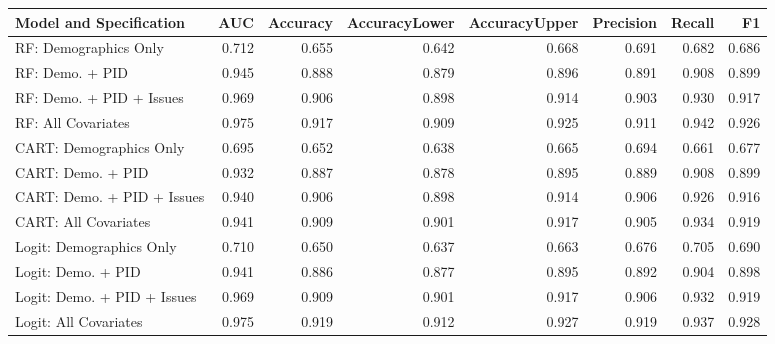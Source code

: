 \begin{table}[H]
\centering
\begin{tabular}{lrrrrrrr}
  \toprule
Model and Specification & AUC & Accuracy & AccuracyLower & AccuracyUpper & Precision & Recall & F1 \\ 
  \midrule
RF: Demographics Only & 0.712 & 0.655 & 0.642 & 0.668 & 0.691 & 0.682 & 0.686 \\ 
  RF: Demo. + PID & 0.945 & 0.888 & 0.879 & 0.896 & 0.891 & 0.908 & 0.899 \\ 
  RF: Demo. + PID + Issues & 0.969 & 0.906 & 0.898 & 0.914 & 0.903 & 0.930 & 0.917 \\ 
  RF: All Covariates & 0.975 & 0.917 & 0.909 & 0.925 & 0.911 & 0.942 & 0.926 \\ 
  CART: Demographics Only & 0.695 & 0.652 & 0.638 & 0.665 & 0.694 & 0.661 & 0.677 \\ 
  CART: Demo. + PID & 0.932 & 0.887 & 0.878 & 0.895 & 0.889 & 0.908 & 0.899 \\ 
  CART: Demo. + PID + Issues & 0.940 & 0.906 & 0.898 & 0.914 & 0.906 & 0.926 & 0.916 \\ 
  CART: All Covariates & 0.941 & 0.909 & 0.901 & 0.917 & 0.905 & 0.934 & 0.919 \\ 
  Logit: Demographics Only & 0.710 & 0.650 & 0.637 & 0.663 & 0.676 & 0.705 & 0.690 \\ 
  Logit: Demo. + PID & 0.941 & 0.886 & 0.877 & 0.895 & 0.892 & 0.904 & 0.898 \\ 
  Logit: Demo. + PID + Issues & 0.969 & 0.909 & 0.901 & 0.917 & 0.906 & 0.932 & 0.919 \\ 
  Logit: All Covariates & 0.975 & 0.919 & 0.912 & 0.927 & 0.919 & 0.937 & 0.928 \\ 
   \bottomrule
\end{tabular}
\end{table}
